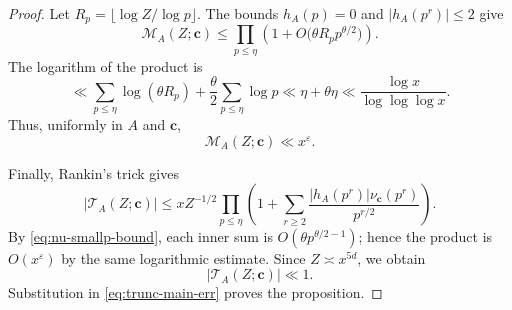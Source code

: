 \documentclass[10pt,a4paper]{amsart}
\newcommand{\cc}{\mathbf{c}}
\renewcommand{\ge}{\geqslant}
\renewcommand{\le}{\leqslant}
\begin{document}
\begin{proof}
Let $R_p=\lfloor\log Z/\log p\rfloor$.
The bounds $h_A(p)=0$ and $|h_A(p^r)|\le2$ give
\[
\mathcal M_A(Z;\cc)
\le\prod_{p\le\eta}
\left(1+O\bigl(\theta R_p p^{\theta/2}\bigr)\right).
\]
The logarithm of the product is
\[
\ll\sum_{p\le\eta}\log(\theta R_p)
+\frac{\theta}{2}\sum_{p\le\eta}\log p
\ll\eta+\theta\eta
\ll\frac{\log x}{\log\log\log x}.
\]
Thus, uniformly in $A$ and $\cc$,
\begin{equation}\label{eq:E2-bound}
\mathcal M_A(Z;\cc)\ll x^\varepsilon.
\end{equation}

Finally, Rankin's trick gives
\begin{equation}\label{eq:large-prime-tail-rankin}
|\mathcal T_A(Z;\cc)|
\le xZ^{-1/2}\prod_{p\le\eta}
\left(1+\sum_{r\ge2}
\frac{|h_A(p^r)|\nu_\cc(p^r)}{p^{r/2}}\right).
\end{equation}
By \eqref{eq:nu-smallp-bound}, each inner sum is $O(\theta p^{\theta/2-1})$; hence the product is $O(x^\varepsilon)$ by the same logarithmic estimate.
Since $Z\asymp x^{5d}$, we obtain
\begin{equation}\label{eq:large-prime-tail-bound}
|\mathcal T_A(Z;\cc)|\ll1.
\end{equation}
Substitution in \eqref{eq:trunc-main-err} proves the proposition.
\end{proof}
\end{document}
